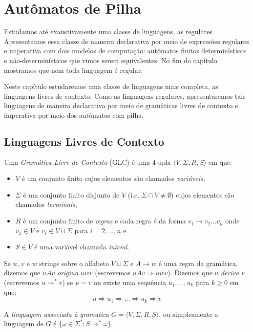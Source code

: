 \chapter{Autômatos de Pilha}
\label{cha:ap}

Estudamos até exaustivamente uma classe de linguagens, as regulares.
Apresentamos essa classe de maneira declarativa por meio de expressões regulares e imperativa com dois modelos de computação: autômatos finitos determinísticos e não-determinísticos que vimos serem equivalentes.
No fim do capítulo mostramos que nem toda linguagem é regular.

Neste capítulo estudaremos uma classe de linguagens mais completa, as linguagens livres de contexto.
Como as linguagens regulares, apresentaremos tais linguagens de maneira declarativa por meio de gramáticas livres de contexto e imperativa por meio dos autômatos com pilha.

\section{Linguagens Livres de Contexto}
\label{sec:llc}

Uma {\em Gramática Livre de Contexto} (GLC) é uma 4-upla $\langle V, \Sigma, R, S \rangle$ em que:
\begin{itemize}
\item[] $V$ é um conjunto finito cujos elementos são chamados {\em variáveis},
\item[] $\Sigma$ é um conjunto finito disjunto de $V$ (i.e. $\Sigma \cap V \neq \emptyset$) cujos elementos são chamados {\em terminais},
\item[] $R$ é um conjunto finito de {\em regras} e cada regra é da forma $v_1 \to v_2 \dots v_n$ onde $v_1 \in V$ e $v_i \in V \cup \Sigma$ para $i = 2, \dots, n$ e
\item[] $S \in V$ é uma variável chamada {\em inicial}.
\end{itemize}

Se $u$, $v$ e $w$ strings sobre o alfabeto $V \cup \Sigma$ e $A \to w$ é uma regra da gramática, dizemos que $uAv$ {\em origina} $uwv$ (escrevemos $uAv \Rightarrow uwv$).
Dizemos que $u$ {\em deriva} $v$ (escrevemos $u \Rightarrow^* v$) se $u = v$ ou existe uma sequência $u_1, \dots, u_k$ para $k \geq 0$ em que:
\begin{displaymath}
  u \Rightarrow u_1 \Rightarrow \dots \Rightarrow u_k \Rightarrow v
\end{displaymath}

A {\em linguagem associada à gramatica} $G = \langle V, \Sigma, R, S \rangle$, ou simplesmente a linguagem de $G$ é $\{\omega \in \Sigma^* : S \Rightarrow^* \omega \}$.

